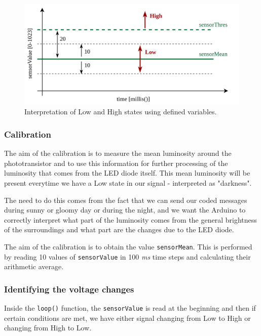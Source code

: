 \documentclass[12pt]{report}
\begin{document}
\begin{figure}[H]
\centering\includegraphics[width=14.5cm]{arduinocode}
\caption{Interpretation of Low and High states using defined variables.}				
\label{fig:arduino_code}
\end{figure}



\subsubsection{Calibration}

The aim of the calibration is to measure the mean luminosity around the phototransistor and to use this information for further processing of the luminosity that comes from the LED diode itself. This mean luminosity will be present everytime we have a Low state in our signal - interpreted as "darkness".

The need to do this comes from the fact that we can send our coded messages during sunny or gloomy day or during the night, and we want the Arduino to correctly interpret what part of the luminosity comes from the general brightness of the surroundings and what part are the changes due to the LED diode.

The aim of the calibration is to obtain the value \verb|sensorMean|. This is performed by reading 10 values of \verb|sensorValue| in 100 \textit{ms} time steps and calculating their arithmetic average.

\subsubsection{Identifying the voltage changes}

Inside the \verb|loop()| function, the \verb|sensorValue| is read at the beginning and then if certain conditions are met, we have either signal changing from Low to High or changing from High to Low.
\end{document}

